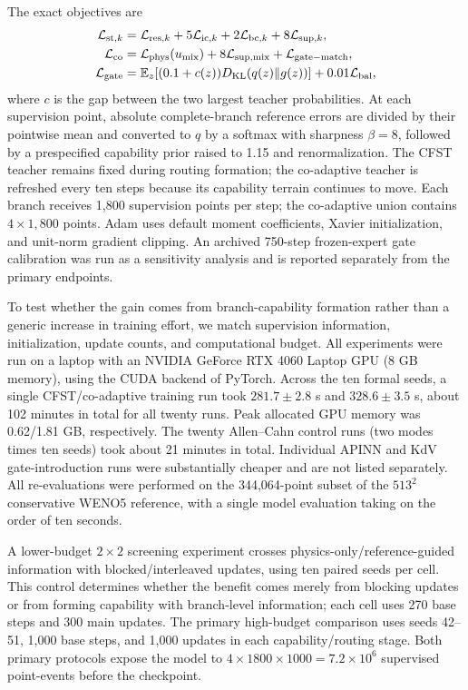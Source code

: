 \documentclass[preprint,12pt]{elsarticle}
\theoremstyle{remark}
\begin{document}
The exact objectives are
\begin{align}
\mathcal L_{{\rm st},k}&=\mathcal L_{{\rm res},k}+5\mathcal L_{{\rm ic},k}+2\mathcal L_{{\rm bc},k}+8\mathcal L_{{\rm sup},k},\\
\mathcal L_{\rm co}&=\mathcal L_{\rm phys}(u_{\rm mix})+8\mathcal L_{{\rm sup},{\rm mix}}+\mathcal L_{\rm gate-match},\\
\mathcal L_{\rm gate}&=\mathbb E_z[(0.1+c(z))D_{\rm KL}(q(z)\|g(z))]+0.01\mathcal L_{\rm bal},
\end{align}
where $c$ is the gap between the two largest teacher probabilities. At each supervision point, absolute complete-branch reference errors are divided by their pointwise mean and converted to $q$ by a softmax with sharpness $\beta=8$, followed by a prespecified capability prior raised to 1.15 and renormalization. The CFST teacher remains fixed during routing formation; the co-adaptive teacher is refreshed every ten steps because its capability terrain continues to move. Each branch receives 1,800 supervision points per step; the co-adaptive union contains $4\times1{,}800$ points. Adam uses default moment coefficients, Xavier initialization, and unit-norm gradient clipping. An archived 750-step frozen-expert gate calibration was run as a sensitivity analysis and is reported separately from the primary endpoints.

To test whether the gain comes from branch-capability formation rather than a generic increase in training effort, we match supervision information, initialization, update counts, and computational budget. All experiments were run on a laptop with an NVIDIA GeForce RTX 4060 Laptop GPU (8 GB memory),
using the CUDA backend of PyTorch.
Across the ten formal seeds, a single CFST/co-adaptive training run took $281.7\pm2.8$ s and $328.6\pm3.5$ s,
about 102 minutes in total for all twenty runs. Peak allocated GPU memory was 0.62/1.81 GB, respectively.
The twenty Allen--Cahn control runs (two modes times ten seeds) took about 21 minutes in total.
Individual APINN and KdV gate-introduction runs were substantially cheaper and are not listed separately.
All re-evaluations were performed on the 344{,}064-point subset of the $513^2$ conservative WENO5 reference,
with a single model evaluation taking on the order of ten seconds.

A lower-budget $2\times2$ screening experiment crosses physics-only/reference-guided information with blocked/interleaved updates, using ten paired seeds per cell. This control determines whether the benefit comes merely from blocking updates or from forming capability with branch-level information; each cell uses 270 base steps and 300 main updates. The primary high-budget comparison uses seeds 42--51, 1,000 base steps, and 1,000 updates in each capability/routing stage. Both primary protocols expose the model to $4\times1800\times1000=7.2\times10^6$ supervised point-events before the checkpoint.
\end{document}

